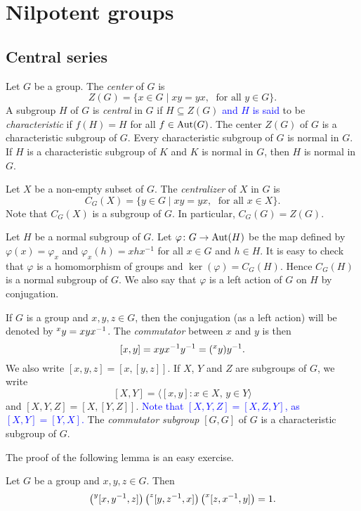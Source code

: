 \chapter{Nilpotent groups}
\label{nilpotent}

\section{Central series}

Let $G$ be a group. The {\em center} of $G$ is 
\[ Z(G)=\{ x\in G\mid xy=yx,\; \mbox{ for all } y\in G\}.\]
A subgroup $H$ of $G$ is {\em central} in $G$ if $H\subseteq Z(G)$ \textcolor{blue}{and 
$H$ is said} to be {\em characteristic} if 
$f(H)= H$ for all $f\in\operatorname{Aut}(G)$. The center $Z(G)$ of $G$ is a characteristic subgroup of $G$. Every characteristic subgroup of $G$ is normal in $G$. 
If $H$ is a characteristic subgroup of $K$ and $K$ is normal in $G$, 
then $H$ is normal in $G$. 


 Let $X$ be a non-empty subset of $G$. The {\em centralizer} of $X$ in $G$ is
\[ C_G(X)=\{ y\in G\mid xy=yx,\;\mbox{ for all }x\in X\}.
\]
Note that $C_G(X)$ is a subgroup of $G$. In particular, $C_G(G)=Z(G)$.

Let $H$ be a normal subgroup of $G$. Let $\varphi\colon G\rightarrow \operatorname{Aut}(H)$ be the map defined by $\varphi(x)=\varphi_x$ and
$\varphi_x(h)=xhx^{-1}$ for all $x\in G$ and $h\in H$. It is easy to check that $\varphi$ is a homomorphism of groups and $\ker(\varphi)=C_G(H)$. Hence $C_G(H)$ is a normal subgroup of $G$. We also say that $\varphi$ is a left action of $G$ on $H$ by conjugation.


If $G$ is a group and $x,y,z\in G$, then the conjugation (as a left action) will be denoted
by $\prescript{x}{}y=xyx^{-1}$.  The {\em commutator} between $x$ and $y$ is then 
\[
[x,y]=xyx^{-1}y^{-1}=(\prescript{x}{}y)y^{-1}.
\]
We also write 
$[x,y,z]=[x,[y,z]]$. 
If $X$, $Y$ and $Z$ are subgroups of $G$, we write 
\[
[X,Y]=\langle [x,y]:x\in X,\,y\in Y\rangle
\]
and $[X,Y,Z]=\left[ X,[Y,Z] \right]$. \textcolor{blue}{Note that
$[X,Y,Z]=[X,Z,Y]$, as $[X,Y]=[Y,X]$.}
The {\em commutator subgroup} $[G,G]$ of $G$ is a characteristic subgroup of $G$.

The proof of the following lemma is an easy exercise.

\begin{lemma}
	\label{xca:HallWitt}
	Let $G$ be a group and $x,y,z\in G$. Then 
	\begin{equation}
		\label{eq:HallWitt}
	\left(\prescript{y}{}[x,y^{-1},z]\right)\left(\prescript{z}{}[y,z^{-1},x]\right)\left(\prescript{x}{}[z,x^{-1},y]\right)=1.
	\end{equation}
\end{lemma}

